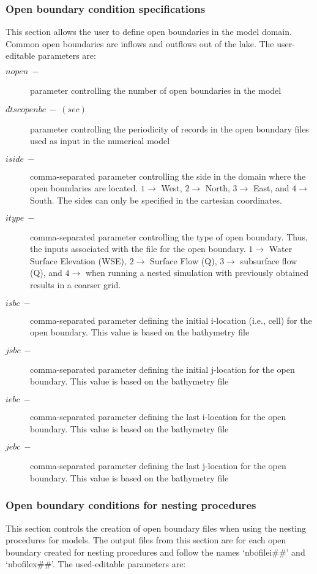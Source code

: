 \subsubsection{Open boundary condition specifications}
This section allows the user to define open boundaries in the model domain. Common open boundaries are inflows and outflows out of the lake. The user-editable parameters are:

\begin{description}
    \item [$nopen\ -$] parameter controlling the number of open boundaries in the model
    \item [$dtscopenbc\ -\ (sec)$] parameter controlling the periodicity of records in the open boundary files used as input in the numerical model
    \item [$iside\ -$] comma-separated parameter controlling the side in the domain where the open boundaries are located. $1 \rightarrow$ West, $2 \rightarrow$ North, $3 \rightarrow$ East, and $4 \rightarrow$ South. The sides can only be specified in the cartesian coordinates. 
    \item [$itype\ -$] comma-separated parameter controlling the type of open boundary. Thus, the inputs associated with the file for the open boundary. $1 \rightarrow$ Water Surface Elevation (WSE), $2 \rightarrow$ Surface Flow (Q), $3 \rightarrow$ subsurface flow (Q), and $4 \rightarrow$ when running a nested simulation with previously obtained results in a coarser grid.
    \item [$isbc\ -$] comma-separated parameter defining the initial i-location (i.e., cell) for the open boundary. This value is based on the bathymetry file
    \item [$jsbc\ -$] comma-separated parameter defining the initial j-location for the open boundary. This value is based on the bathymetry file
    \item [$iebc\ -$] comma-separated parameter defining the last i-location for the open boundary. This value is based on the bathymetry file
    \item [$jebc\ -$] comma-separated parameter defining the last j-location for the open boundary. This value is based on the bathymetry file    
\end{description}

\subsubsection{Open boundary conditions for nesting procedures}
This section controls the creation of open boundary files when using the nesting procedures for models. The output files from this section are for each open boundary created for nesting procedures and follow the names `nbofilei\#\#' and `nbofilex\#\#'. The used-editable parameters are:

